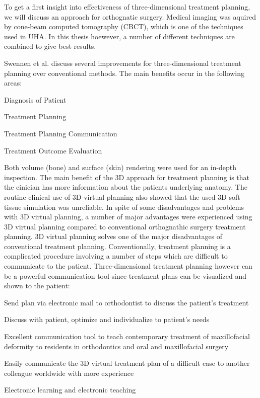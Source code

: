 To get a first insight into effectiveness of three-dimensional treatment planning, we will discuss an approach for orthognatic surgery.
Medical imaging was aquired by cone-beam computed tomography (CBCT), which is one of the techniques used in UHA.
In this thesis hoewever, a number of different techniques are combined to give best results.

Swennen et al. discuss several improvements for three-dimensional treatment planning over conventional methods.
The main benefits occur in the following areas:

\begin{compactenum}[label=(\alph*)]
    \item Diagnosis of Patient
    \item Treatment Planning
    \item Treatment Planning Communication
    \item Treatment Outcome Evaluation
\end{compactenum}

Both volume (bone) and surface (skin) rendering were used for an in-depth inspection.
The main benefit of the 3D approach for treatment planning is that the cinician has more information about the patients underlying anatomy.
The routine clinical use of 3D virtual planning also showed that the used 3D soft-tissue simulation was unreliable.
In spite of some disadvantages and problems with 3D virtual planning, a number of major advantages were experienced using 3D virtual planning compared to conventional orthognathic surgery treatment planning.
3D virtual planning solves one of the major disadvantages of conventional treatment planning. Conventionally, treatment planning is a complicated procedure involving a number of steps which are difficult to communicate to the patient.
Three-dimensional treatment planning however can be a powerful communication tool since treatment plans can be visualized and shown to the patient:

\begin{compactenum}[label=(\alph*)]
    \item Send plan via electronic mail to orthodontist to discuss the patient’s treatment
    \item Discuss with patient, optimize and individualize to patient's needs
    \item Excellent communication tool to teach contemporary treatment of maxillofacial deformity to residents in orthodontics and oral and maxillofacial surgery
    \item Easily communicate the 3D virtual treatment plan of a difficult case to another colleague worldwide with more experience
    \item Electronic learning and electronic teaching
\end{compactenum}

